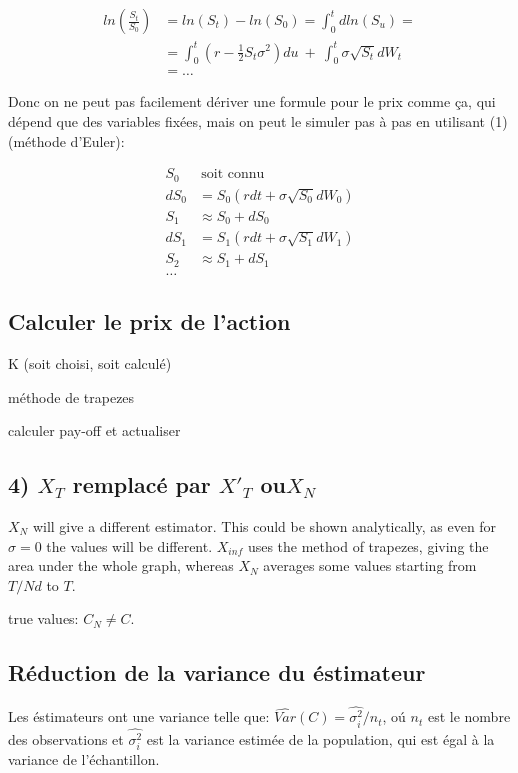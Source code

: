 \documentclass[a4paper,12pt]{scrartcl}
\begin{document}
\begin{align*}
ln( \frac{S_t}{S_0} ) 
&= ln(S_t)-ln(S_0) = \int_0^t dln(S_u) = \\
&= \int_0^t (r-\frac{1}{2} S_t \sigma^2)du~+~\int_0^t \sigma \sqrt{S_t}dW_t \\
&=\dots
\end{align*}

Donc on ne peut pas facilement dériver une formule pour le prix comme ça, qui dépend que des variables fixées, mais on peut le simuler pas à pas en utilisant (1) (méthode d'Euler):

\begin{equation} \label{6}
\begin{split}
S_0  &~\text{soit connu} \\
dS_0 &= S_0(rdt + \sigma \sqrt{S_0} dW_0) \\
S_1  &\approx S_0 + dS_0 \\
dS_1 &= S_1(rdt + \sigma \sqrt{S_1} dW_1) \\
S_2  &\approx S_1 + dS_1 \\
\dots
\end{split}
\end{equation}

\subsection{Calculer le prix de l'action}

K (soit choisi, soit calculé)

méthode de trapezes

calculer pay-off et actualiser

\subsection{4) $X_T$ remplacé par $X'_T$ ou$X_N$}
$X_N$ will give a different estimator.
This could be shown analytically, as even for $\sigma = 0$ the values will be different.
$X_{inf}$ uses the method of trapezes, giving the area under the whole graph, whereas $X_N$ averages some values starting from $T/Nd$ to $T$.

true values: $C_N \neq C$.

\subsection{Réduction de la variance du éstimateur}

Les éstimateurs ont une variance telle que:
$ \hat{Var}(C) = \hat{\sigma_i^2} / n_t$, oú $n_t$ est le nombre des observations et $\hat{\sigma_i^2}$ est la variance estimée de la population, qui est égal à la variance de l'échantillon.
\end{document}
